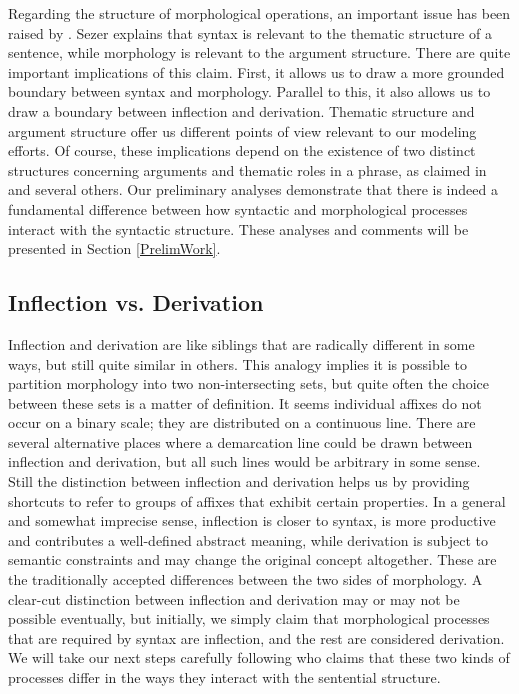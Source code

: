 \documentclass[11pt]{article} %
\begin{document}
Regarding the structure of morphological operations, an important issue has been raised by \citet{Sezer1991}. Sezer explains that syntax is relevant to the thematic structure of a sentence, while morphology is relevant to the argument structure. There are quite important implications of this claim. First, it allows us to draw a more grounded boundary between syntax and morphology. Parallel to this, it also allows us to draw a boundary between inflection and derivation. Thematic structure and argument structure offer us different points of view relevant to our modeling efforts. Of course, these implications depend on the existence of two distinct structures concerning arguments and thematic roles in a phrase, as claimed in \citet{Grimshaw1990} and several others. Our preliminary analyses demonstrate that there is indeed a fundamental difference between how syntactic and morphological processes interact with the syntactic structure. These analyses and comments will be presented in Section \ref{PrelimWork}. \\

\subsection{Inflection vs. Derivation}

\label{InflDeriv}

Inflection and derivation are like siblings that are radically different in some ways, but still quite similar in others. This analogy implies it is possible to partition morphology into two non-intersecting sets, but quite often the choice between these sets is a matter of definition. It seems individual affixes do not occur on a binary scale; they are distributed on a continuous line. There are several alternative places where a demarcation line could be drawn between inflection and derivation, but all such lines would be arbitrary in some sense. \\

Still the distinction between inflection and derivation helps us by providing shortcuts to refer to groups of affixes that exhibit certain properties. In a general and somewhat imprecise sense, inflection is closer to syntax, is more productive and contributes a well-defined abstract meaning, while derivation is subject to semantic constraints and may change the original concept altogether. These are the traditionally accepted differences between the two sides of morphology. A clear-cut distinction between inflection and derivation may or may not be possible eventually, but initially, we simply claim that morphological processes that are required by syntax are inflection, and the rest are considered derivation. We will take our next steps carefully following \citet{Sezer1991} who claims that these two kinds of processes differ in the ways they interact with the sentential structure. \\
\end{document}

